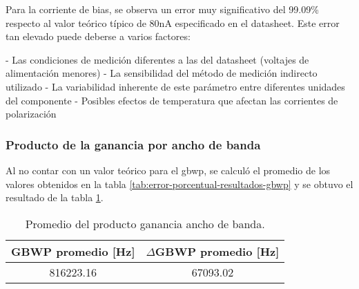 Para la corriente de bias, se observa un error muy significativo del 99.09\% respecto al valor teórico típico de 80nA especificado en el datasheet. Este error tan elevado puede deberse a varios factores:

- Las condiciones de medición diferentes a las del datasheet (voltajes de alimentación menores)
- La sensibilidad del método de medición indirecto utilizado
- La variabilidad inherente de este parámetro entre diferentes unidades del componente
- Posibles efectos de temperatura que afectan las corrientes de polarización


\subsubsection{Producto de la ganancia por ancho de banda}

Al no contar con un valor teórico para el gbwp, se calculó el promedio de los valores obtenidos en la tabla \ref{tab:error-porcentual-resultados-gbwp} y se obtuvo el resultado de la tabla \ref{tab:promedio-gbwp}.

\begin{table}[h!]
\centering
\begin{tabular}{|c|c|}
\hline
GBWP promedio [Hz] & $\Delta$GBWP promedio [Hz] \\ \hline
816223.16 & 67093.02 \\ \hline
\end{tabular}
\caption{Promedio del producto ganancia ancho de banda.}
\label{tab:promedio-gbwp}
\end{table}

\begin{table}[h!]
\centering
{}
\caption{Error porcentual del producto ganancia ancho de banda.}
\label{tab:error-porcentual-resultados-gbwp}
\end{table}


